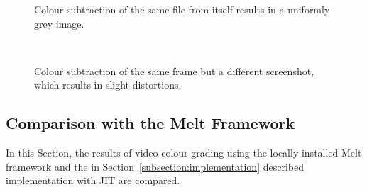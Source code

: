 \documentclass[../MasterThesis.tex]{subfiles}
\begin{document}
\begin{minipage}{0.48\textwidth}
	
	\begin{figure}[H]
		\begin{center}
			\caption[Colour subtraction of the same file from itself.]{Colour subtraction of the same file from itself results in a uniformly grey image.}
			\label{figure:greyresult_unit}
		\end{center}
	\end{figure}
\end{minipage}\begin{minipage}{0.04\textwidth}
	\ 
\end{minipage}\begin{minipage}{0.48\textwidth}	
	\begin{figure}[H]
		\begin{center}
			\caption[Colour subtraction of the same frame but a different screenshot.]{Colour subtraction of the same frame but a different screenshot, which results in slight distortions.}
			\label{figure:greyresult_blurry}
		\end{center}
	\end{figure}
\end{minipage}









\subsection{Comparison with the Melt Framework} \label{section:comparisonMelt}


In this Section, the results of video colour grading using the locally installed Melt framework and the in Section~\ref{subsection:implementation} described implementation with JIT are compared. 
\end{document}
